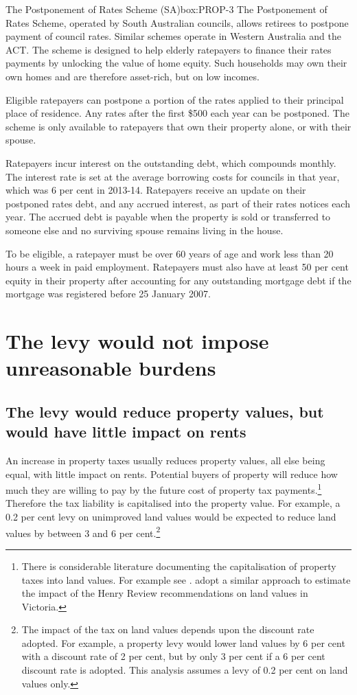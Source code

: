 \documentclass[twoside,english]{grattanBudgetRepairb5portrait}
\begin{document}
\begin{smallbox}[tp]{The Postponement of Rates Scheme (SA)}{box:PROP-3}
The Postponement of Rates Scheme, operated by South Australian councils, allows retirees to postpone payment of council rates. Similar schemes operate in Western Australia and the ACT\@. The scheme is designed to help elderly ratepayers to finance their rates payments by unlocking the value of home equity. Such households may own their own homes and are therefore asset-rich, but on low incomes.

Eligible ratepayers can postpone a portion of the rates applied to their principal place of residence. Any rates after the first \$500 each year can be postponed. The scheme is only available to ratepayers that own their property alone, or with their spouse.

Ratepayers incur interest on the outstanding debt, which compounds monthly. The interest rate is set at the average borrowing costs for councils in that year, which was 6 per cent in 2013-14. Ratepayers receive an update on their postponed rates debt, and any accrued interest, as part of their rates notices each year. The accrued debt is payable when the property is sold or transferred to someone else and no surviving spouse remains living in the house. 

To be eligible, a ratepayer must be over 60 years of age and work less than 20 hours a week in paid employment. Ratepayers must also have at least 50 per cent equity in their property after accounting for any outstanding mortgage debt if the mortgage was registered before 25 January 2007. 
\end{smallbox} 

\chapter{The levy would not impose unreasonable burdens\label{chapter:PROP-7}}
\section{The levy would reduce property values, but would have little impact on rents\label{sec:PROP-7-1}}
An increase in property taxes usually reduces property values, all else being equal, with little impact on rents. Potential buyers of property will reduce how much they are willing to pay by the future cost of property tax payments.\footnote{There is considerable literature documenting the capitalisation of property taxes into land values. For example see \textcites{Oates1969}{oates2009simple}. \textcite[][22]{WoodOngCigdemEtAl2012} adopt a similar approach to estimate the impact of the Henry Review recommendations on land values in Victoria.}  Therefore the tax liability is capitalised into the property value. For example, a 0.2 per cent levy on unimproved land values would be expected to reduce land values by between 3 and 6 per cent.\footnote{The impact of the tax on land values depends upon the discount rate adopted.  For example, a property levy would lower land values by 6 per cent with a discount rate of 2 per cent, but by only 3 per cent if a 6 per cent discount rate is adopted. This analysis assumes a levy of 0.2 per cent on land values only.}
\end{document}
